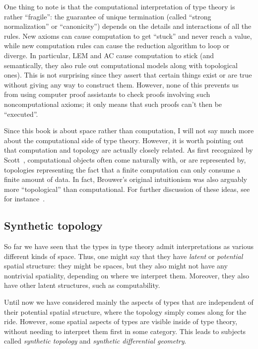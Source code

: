 \documentclass[12pt]{article}
\numberwithin{equation}{section}
\begin{document}
One thing to note is that the computational interpretation of type theory is rather ``fragile'': the guarantee of unique termination (called ``strong normalization'' or ``canonicity'') depends on the details and interactions of all the rules.
New axioms can cause computation to get ``stuck'' and never reach a value, while new computation rules can cause the reduction algorithm to loop or diverge.
In particular, LEM and AC cause computation to stick (and semantically, they also rule out computational models along with topological ones).
This is not surprising since they assert that certain things exist or are true without giving any way to construct them.
However, none of this prevents us from using computer proof assistants to check proofs involving such noncomputational axioms; it only means that such proofs can't then be ``executed''.

Since this book is about space rather than computation, I will not say much more about the computational side of type theory.
However, it is worth pointing out that computation and topology are actually closely related.
As first recognized by Scott~\cite{scott:cts-lattices,scott:dt-lat,scott:ttalt}, computational objects often come naturally with, or are represented by, topologies representing the fact that a finite computation can only consume a finite amount of data.
In fact, Brouwer's original intuitionism was also arguably more ``topological'' than computational.
For further discussion of these ideas, see for instance~\cite{escardo:syntop-datatypes,vickers:topology-via-logic}.


\subsection{Synthetic topology}
\label{sec:synthetic-topology-1}

So far we have seen that the types in type theory admit interpretations as various different kinds of space.
Thus, one might say that they have \emph{latent} or \emph{potential} spatial structure: they {might} be spaces, but they also might not have any nontrivial spatiality, depending on where we interpret them.
Moreover, they also have other latent structures, such as computability.

Until now we have considered mainly the aspects of types that are {independent} of their potential spatial structure, where the topology simply comes along for the ride.
However, some spatial aspects of types are visible {inside} of type theory, without needing to interpret them first in some category.
This leads to subjects called \emph{synthetic topology} and \emph{synthetic differential geometry}.%
\end{document}
